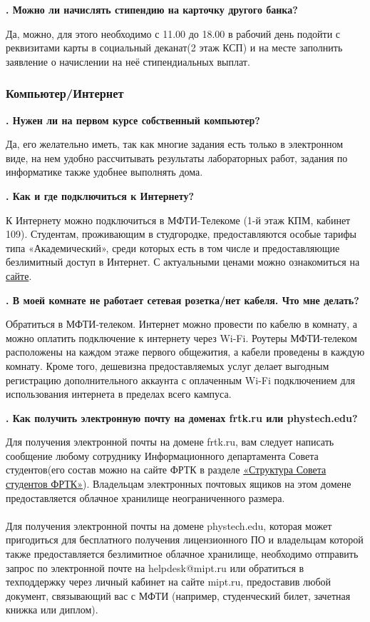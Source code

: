 \documentclass[14pt]{extarticle}
\newcounter{question}
\newcommand\Que[1]{%
    \begin{minipage}{\textwidth}
    \leavevmode\par
    \stepcounter{question}
    \noindent
    {\large\textbf{\thequestion. #1}}\par}
\newcommand\Ans[2][]{%
    \leavevmode\par\noindent
    {\leftskip37pt
    \textbf{#1}#2\par}
    \end{minipage}}
\begin{document}
\Que{Можно ли начислять стипендию на карточку другого банка?}
\Ans{Да, можно, для этого необходимо с 11.00 до 18.00 в рабочий день подойти с реквизитами карты в социальный деканат(2 этаж КСП) и на месте заполнить заявление о начислении на неё стипендиальных выплат. }

\subsubsection{Компьютер/Интернет}

\Que{Нужен ли на первом курсе собственный компьютер?}
\Ans{Да, его желательно иметь, так как многие задания есть только в электронном виде, на нем удобно рассчитывать результаты лабораторных работ, задания по информатике также удобнее выполнять дома.}

\Que{Как и где подключиться к Интернету?}
\Ans{К Интернету можно подключиться в МФТИ-Телекоме (1-й этаж КПМ, кабинет 109). Студентам, проживающим в студгородке, предоставляются особые тарифы типа «Академический», среди которых есть в том числе и предоставляющие безлимитный доступ в Интернет. С актуальными ценами можно ознакомиться на \href{http://mipt-telecom.ru/}{сайте}.}

\Que{В моей комнате не работает сетевая розетка/нет кабеля. Что мне делать?}
\Ans{Обратиться в МФТИ-телеком. Интернет можно провести по кабелю в комнату, а можно оплатить подключение к интернету через Wi-Fi. Роутеры МФТИ-телеком расположены на каждом этаже первого общежития, а кабели проведены в каждую комнату. Кроме того, дешевизна предоставляемых услуг делает выгодным регистрацию дополнительного аккаунта с оплаченным Wi-Fi подключением для использования интернета в пределах всего кампуса.}

\Que{Как получить электронную почту на доменах frtk.ru или phystech.edu?}
\Ans{Для получения электронной почты на домене frtk.ru, вам следует написать сообщение любому сотруднику Информационного департамента Совета студентов(его состав можно на сайте ФРТК в разделе \href{https://mipt.ru/drec/forstudents/studsovet/structure.php}{«Структура Совета студентов ФРТК»}). Владельцам электронных почтовых ящиков на этом домене предоставляется облачное хранилище неограниченного размера. \\ \\ Для получения электронной почты на домене phystech.edu, которая может пригодиться для бесплатного получения лицензионного ПО и владельцам которой также предоставляется безлимитное облачное хранилище, необходимо отправить запрос по электронной почте на helpdesk@mipt.ru или обратиться в техподдержку через личный кабинет на сайте mipt.ru, предоставив любой документ, связывающий вас с МФТИ (например, студенческий билет, зачетная книжка или диплом).}
\end{document}
